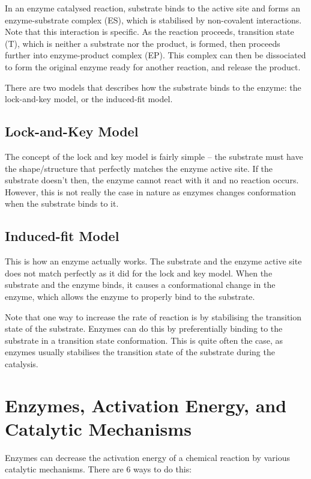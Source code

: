 In an enzyme catalysed reaction, substrate binds to the active site and forms an enzyme-substrate complex (ES), which is stabilised by non-covalent interactions.
Note that this interaction is specific.
As the reaction proceeds, transition state (T), which is neither a substrate nor the product, is formed, then proceeds further into enzyme-product complex (EP).
This complex can then be dissociated to form the original enzyme ready for another reaction, and release the product.

There are two models that describes how the substrate binds to the enzyme: the lock-and-key model, or the induced-fit model.

\subsection{Lock-and-Key Model}

The concept of the lock and key model is fairly simple -- the substrate must have the shape/structure that perfectly matches the enzyme active site.
If the substrate doesn't then, the enzyme cannot react with it and no reaction occurs.
However, this is not really the case in nature as enzymes changes conformation when the substrate binds to it.

\subsection{Induced-fit Model}

This is how an enzyme actually works.
The substrate and the enzyme active site does not match perfectly as it did for the lock and key model.
When the substrate and the enzyme binds, it causes a conformational change in the enzyme, which allows the enzyme to properly bind to the substrate.

Note that one way to increase the rate of reaction is by stabilising the transition state of the substrate.
Enzymes can do this by preferentially binding to the substrate in a transition state conformation.
This is quite often the case, as enzymes usually stabilises the transition state of the substrate during the catalysis.

\section{Enzymes, Activation Energy, and \\Catalytic Mechanisms}

Enzymes can decrease the activation energy of a chemical reaction by various catalytic mechanisms.
There are 6 ways to do this:

